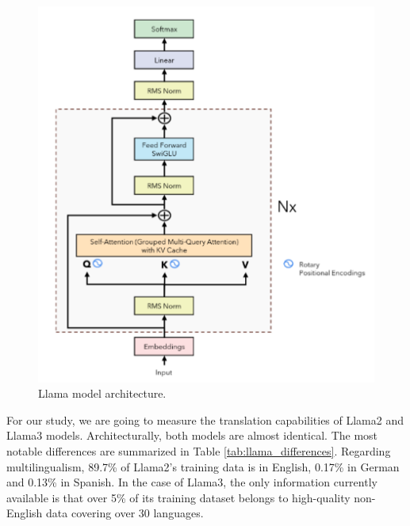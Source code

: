 \documentclass[11pt,english,listoffigures,listoftables]{tfgetsinf}
\begin{document}
\begin{figure}[h]
    \centering
    \includegraphics[width=0.5\linewidth]{figures/llama.pdf}
    \caption{Llama model architecture.\protect\footnotemark}
    \label{fig:llama}
\end{figure}

For our study, we are going to measure the translation capabilities of Llama2 and Llama3 models. Architecturally, both models are almost identical. The most notable differences are summarized in Table \ref{tab:llama_differences}. Regarding multilingualism, 89.7\% of Llama2's training data is in English, 0.17\% in German and 0.13\% in Spanish. In the case of Llama3, the only information currently available is that over 5\% of its training dataset belongs to high-quality non-English data covering over 30 languages.

\begin{table}[h]
    \centering
    \caption{Main differences between Llama2 and Llama3}
    \label{tab:llama_differences}
\end{table}
\end{document}
